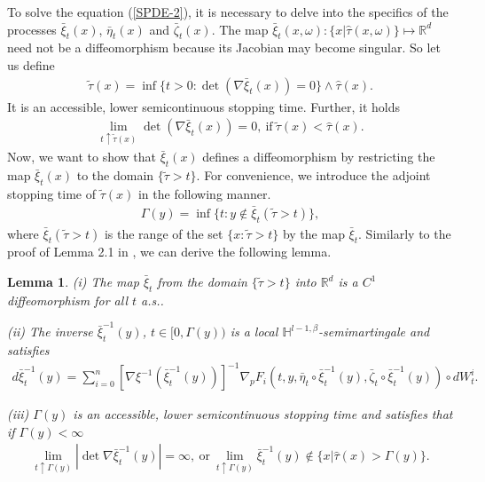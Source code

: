 \documentclass[12pt,oneside, reqno]{amsart}
\newcommand{\be}{\begin{eqnarray}}
\newcommand{\ee}{\end{eqnarray}}
\newcommand{\ce}{\begin{eqnarray*}}
\newcommand{\de}{\end{eqnarray*}}
\newtheorem{lemma}[theorem]{Lemma}
\def\mH{{\mathbb H}}
\def\mR{{\mathbb R}}
\numberwithin{equation}{section}
\begin{document}
   To solve the equation (\ref{SPDE-2}), it is necessary to delve into the specifics of the processes $\bar{\xi}_t(x)$, $\bar{\eta}_t(x)$ and $\bar{\zeta}_t(x)$. The map $\bar{\xi}_t(x,\omega):\{x|\hat{\tau}(x,\omega)\}\mapsto \mR^d$ need not be a diffeomorphism because its Jacobian may become singular.  So let us define 
   \ce 
   \tilde{\tau}(x)=\inf\{t>0:\det(\nabla \bar{\xi}_t(x))=0\}\wedge \hat{\tau}(x).
   \de 
	It is an accessible, lower semicontinuous stopping time. Further, it holds 
	\ce 
	\lim_{t\uparrow \tilde{\tau}(x)}\det(\nabla \bar{\xi}_t(x))=0, ~\mbox{if}~\tilde{\tau}(x)<\hat{\tau}(x).
	\de 
	Now, we want to show that $\bar{\xi}_t(x)$ defines a diffeomorphism by restricting the map $\bar{\xi}_t(x)$ to the domain $\{\tilde{\tau}>t\}$. For convenience, we introduce the adjoint stopping time of   $\tilde{\tau}(x)$ in the following manner.
	\be \label{stopping-time1}
	\varGamma(y)=\inf\{t:y\notin\bar{\xi}_t(\tilde{\tau}>t) \},
	\ee 
	where $\bar{\xi}_t(\tilde{\tau}>t)$ is the range of the set $\{x:\tilde{\tau}>t\}$ by the map  $\bar{\xi}_t$. Similarly to the proof of Lemma 2.1 in \cite{Kunita1984}, we can derive the following lemma.
	\begin{lemma}\label{inverse-flow}
		(i) The map $\bar{\xi}_t$ from the domain  $\{\tilde{\tau}>t\}$ into $\mR^d$ is a $C^1$ diffeomorphism for all $t$ a.s..
		
		(ii) The inverse $\bar{\xi}_t^{-1}(y)$, $t\in [0,\varGamma(y))$ is a local $\mH^{l-1,\beta}$-semimartingale and satisfies
		\ce 
		d\bar{\xi}^{-1}_t(y)=\sum_{i=0}^{n} [\nabla\xi^{-1}(\bar{\xi}_t^{-1}(y))]^{-1}\nabla_pF_i(t,	y,\bar\eta_t\circ\bar{\xi}_t^{-1}(y) , \bar\zeta_t\circ\bar{\xi}_t^{-1}(y))\circ dW_t^i.
		\de
		
		(iii) $\varGamma(y)$ is an accessible, lower semicontinuous stopping time and satisfies that if $\varGamma(y)<\infty$
		\ce 
		\lim_{t\uparrow \varGamma(y)} |\det \nabla \bar{\xi}_t^{-1}(y)|=\infty,~\mbox{or}~\lim_{t\uparrow \varGamma(y)}\bar{\xi}_t^{-1}(y)\notin \{x|\hat{\tau}(x)>\varGamma(y)\}.
		\de 
	\end{lemma}
\end{document}
